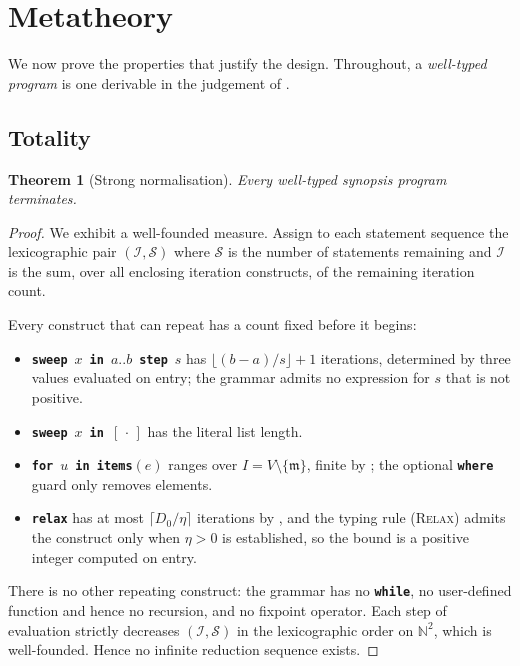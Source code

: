 \documentclass[11pt,twocolumn,a4paper]{article}
\theoremstyle{plain}
\newtheorem{theorem}{Theorem}[section]
\theoremstyle{definition}
\theoremstyle{remark}
\newcommand{\med}{\mathfrak{m}}                %
\newcommand{\Ver}{V}
\newcommand{\dem}{D}
\newcommand{\kw}[1]{\texttt{\textbf{#1}}}
\begin{document}
\section{Metatheory}
\label{sec:meta}

We now prove the properties that justify the design. Throughout, a
\emph{well-typed program} is one derivable in the judgement of
.

\subsection{Totality}

\begin{theorem}[Strong normalisation]
\label{thm:total}
Every well-typed synopsis program terminates.
\end{theorem}

\begin{proof}
We exhibit a well-founded measure. Assign to each statement sequence the
lexicographic pair $(\mathcal{I}, \mathcal{S})$ where $\mathcal{S}$ is
the number of statements remaining and $\mathcal{I}$ is the sum, over
all enclosing iteration constructs, of the remaining iteration count.

Every construct that can repeat has a count fixed before it begins:
\begin{itemize}[leftmargin=1.4em]
\item \kw{sweep}~$x$~\kw{in}~$a..b$~\kw{step}~$s$ has
      $\lfloor (b-a)/s\rfloor+1$ iterations, determined by three values
      evaluated on entry; the grammar admits no expression for $s$ that
      is not positive.
\item \kw{sweep}~$x$~\kw{in}~$[\,\cdot\,]$ has the literal list length.
\item \kw{for}~$u$~\kw{in items}$(e)$ ranges over
      $I=\Ver\setminus\{\med\}$, finite by ; the optional
      \kw{where} guard only removes elements.
\item \kw{relax} has at most $\lceil \dem_0/\eta\rceil$ iterations by
      , and the typing rule \textsc{(Relax)}
      admits the construct only when $\eta>0$ is established, so the
      bound is a positive integer computed on entry.
\end{itemize}
There is no other repeating construct: the grammar has no \kw{while}, no
user-defined function and hence no recursion, and no fixpoint operator.
Each step of evaluation strictly decreases $(\mathcal{I},\mathcal{S})$
in the lexicographic order on $\mathbb{N}^2$, which is well-founded.
Hence no infinite reduction sequence exists.
\end{proof}
\end{document}
